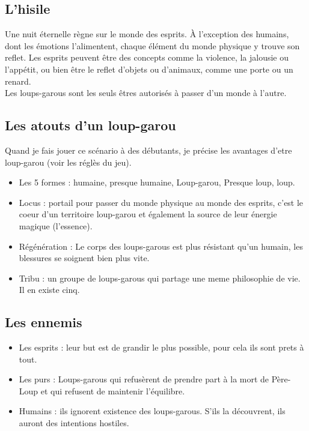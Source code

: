 \documentclass[oneside,12pt]{book}
\begin{document}
\begin{flushleft}
   \subsection{L'hisile}    
Une nuit éternelle règne sur le monde des esprits. 
À l’exception des humains, dont les émotions l’alimentent, chaque élément du monde physique y trouve son reflet. 
Les esprits peuvent être des concepts comme la violence, la jalousie ou l'appétit, ou bien être le reflet d’objets ou d’animaux, comme une porte ou un renard.\\ Les loups-garous sont les seuls êtres autorisés à passer d’un monde à l’autre.

\subsection{Les atouts d'un loup-garou}
Quand je fais jouer ce scénario à des débutants, je précise les avantages d'etre loup-garou (voir les réglès du jeu).
\begin{itemize}
\item Les 5 formes : humaine, presque humaine, Loup-garou, Presque loup, loup.
\item Locus : portail pour passer du monde physique au monde des esprits, c'est le coeur d'un territoire loup-garou et également la source de leur énergie magique (l'essence). 
\item Régénération : Le corps des loups-garous est plus résistant qu'un humain, les blessures se soignent bien plus vite.
\item Tribu : un groupe de loups-garous qui partage une meme philosophie de vie. Il en existe cinq.
\end{itemize}

\subsection{Les ennemis}
\begin{itemize}
\item Les esprits : leur but est de grandir le plus possible, pour cela ils sont prets à tout. 
\item Les purs : Loups-garous qui refusèrent de prendre part à la mort de Père-Loup et qui refusent de maintenir l'équilibre.
\item Humains : ils ignorent existence des loups-garous. S’ils la découvrent, ils auront des intentions hostiles.
\end{itemize}



\end{flushleft}
\end{document}
